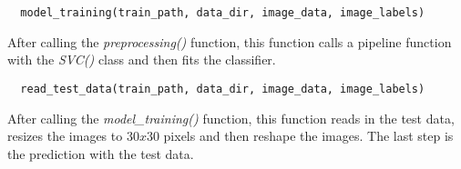 \begin{lstlisting}
  model_training(train_path, data_dir, image_data, image_labels)
\end{lstlisting}

\noindent After calling the \textit{preprocessing()} function, this function calls a pipeline function with the \textit{SVC()} class and then fits the classifier.

\begin{lstlisting}
  read_test_data(train_path, data_dir, image_data, image_labels)
\end{lstlisting}

\noindent After calling the \textit{model\_training()} function, this function reads in the test data, resizes the images to $30x30$ pixels and then reshape the images. The last step is the prediction with the test data.
